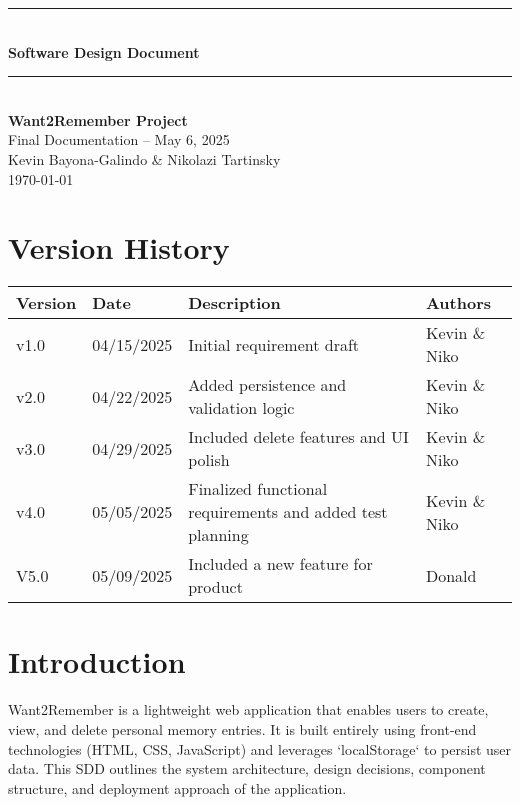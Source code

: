 \documentclass[12pt]{article}
\begin{document}
\begin{titlepage}
    \newcommand{\HRule}{\rule{\linewidth}{0.5mm}} 
    \vspace*{\fill}
    \begin{center}
        \HRule \\[0.5cm]
        {\Huge \bfseries Software Design Document \\[0.4cm]}
        \HRule \\[1.5cm]
        {\LARGE \textbf{Want2Remember Project}}\\[0.5cm]
        {\Large Final Documentation – May 6, 2025}\\[2cm]
        {\Large Kevin Bayona-Galindo \& Nikolazi Tartinsky}\\[0.5cm]
        {\large \today}
    \end{center}
    \vspace*{\fill}
\end{titlepage}

\tableofcontents
\newpage

\section*{Version History}
\begin{longtable}{|p{3cm}|p{3cm}|p{6cm}|p{4cm}|}
\hline
\textbf{Version} & \textbf{Date} & \textbf{Description} & \textbf{Authors} \\
\hline
v1.0 & 04/15/2025 & Initial requirement draft & Kevin \& Niko \\
\hline
v2.0 & 04/22/2025 & Added persistence and validation logic & Kevin \& Niko \\
\hline
v3.0 & 04/29/2025 & Included delete features and UI polish & Kevin \& Niko \\
\hline
v4.0 & 05/05/2025 & Finalized functional requirements and added test planning & Kevin \& Niko \\
\hline
V5.0 & 05/09/2025 & Included a new feature for product & Donald \\
\hline
\end{longtable}

\section{Introduction}
Want2Remember is a lightweight web application that enables users to create, view, and delete personal memory entries. It is built entirely using front-end technologies (HTML, CSS, JavaScript) and leverages `localStorage` to persist user data. This SDD outlines the system architecture, design decisions, component structure, and deployment approach of the application.
\end{document}
